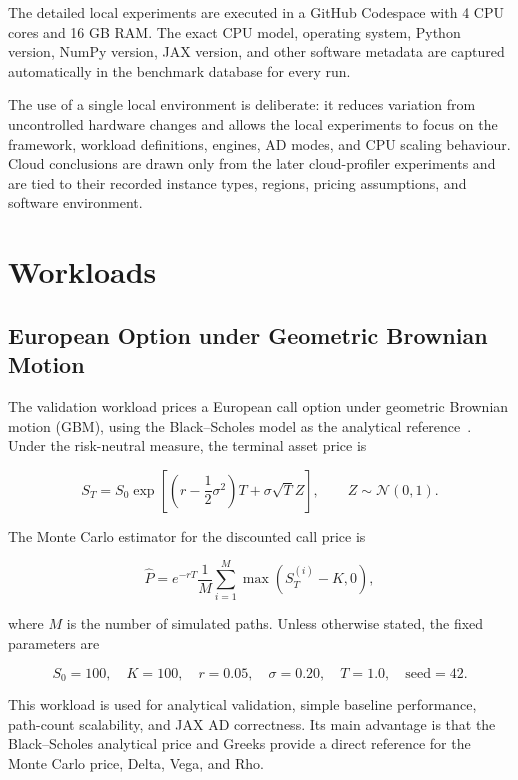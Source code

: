 The detailed local experiments are executed in a GitHub Codespace with 4 CPU
cores and 16 GB RAM.  The exact CPU model, operating system, Python version,
NumPy version, JAX version, and other software metadata are captured
automatically in the benchmark database for every run.

The use of a single local environment is deliberate: it reduces variation from
uncontrolled hardware changes and allows the local experiments to focus on the
framework, workload definitions, engines, AD modes, and CPU scaling behaviour.
Cloud conclusions are drawn only from the later cloud-profiler experiments and
are tied to their recorded instance types, regions, pricing assumptions, and
software environment.

\section{Workloads}
\label{sec:exp-workloads}

\subsection{European Option under Geometric Brownian Motion}
\label{sec:exp-workload-european}

The validation workload prices a European call option under geometric
Brownian motion (GBM), using the Black--Scholes model as the analytical
reference~\cite{blackscholes1973}. Under the risk-neutral measure, the terminal asset
price is

\[
    S_T
    =
    S_0
    \exp\!\left[
        \left(r - \frac{1}{2}\sigma^2\right)T
        + \sigma\sqrt{T}Z
    \right],
    \qquad
    Z \sim \mathcal{N}(0,1).
\]

The Monte Carlo estimator for the discounted call price is

\[
    \hat{P}
    =
    e^{-rT}
    \frac{1}{M}
    \sum_{i=1}^{M}
    \max(S_T^{(i)} - K, 0),
\]

where \(M\) is the number of simulated paths.  Unless otherwise stated, the
fixed parameters are

\[
    S_0 = 100,\quad
    K = 100,\quad
    r = 0.05,\quad
    \sigma = 0.20,\quad
    T = 1.0,\quad
    \text{seed} = 42.
\]

This workload is used for analytical validation, simple baseline
performance, path-count scalability, and JAX AD correctness.  Its main
advantage is that the Black--Scholes analytical price and Greeks provide a
direct reference for the Monte Carlo price, Delta, Vega, and Rho.

